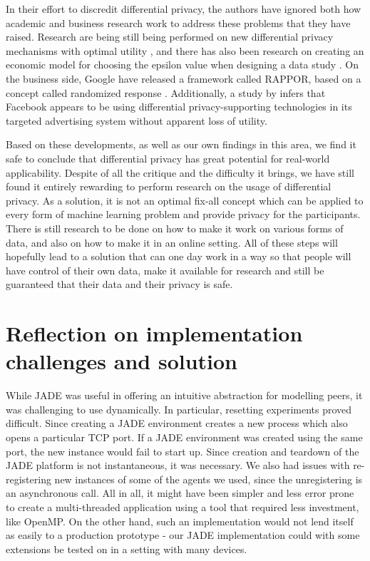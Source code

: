 In their effort to discredit differential privacy, the authors have ignored both how academic and business research work to address these problems that they have raised. Research are being still being performed on new differential privacy mechanisms with optimal utility \citep{eigner2014privada}, and there has also been research on creating an economic model for choosing the epsilon value when designing a data study \citep{hsu2014economicEpsilon}. On the business side, Google have released a framework called RAPPOR, based on a concept called randomized response \citep{erlingsson2014rappor}. Additionally, a study by \cite{chin2012differential} infers that Facebook appears to be using differential privacy-supporting technologies in its targeted advertising system without apparent loss of utility.

Based on these developments, as well as our own findings in this area, we find it safe to conclude that differential privacy has great potential for real-world applicability. Despite of all the critique and the difficulty it brings, we have still found it entirely rewarding to perform research on the usage of differential privacy. As a solution, it is not an optimal fix-all concept which can be applied to every form of machine learning problem and provide privacy for the participants. There is still research to be done on how to make it work on various forms of data, and also on how to make it in an online setting. All of these steps will hopefully lead to a solution that can one day work in a way so that people will have control of their own data, make it available for research and still be guaranteed that their data and their privacy is safe. 

\section{Reflection on implementation challenges and solution}
While JADE was useful in offering an intuitive abstraction for modelling peers, it was challenging to use dynamically. In particular, resetting experiments proved difficult. Since creating a JADE environment creates a new process which also opens a particular TCP port. If a JADE environment was created using the same port, the new instance would fail to start up. Since creation and teardown of the JADE platform is not instantaneous, it was necessary. We also had issues with re-registering new instances of some of the agents we used, since the unregistering is an asynchronous call. All in all, it might have been simpler and less error prone to create a multi-threaded application using a tool that required less investment, like OpenMP. On the other hand, such an implementation would not lend itself as easily to a production prototype - our JADE implementation could with some extensions be tested on in a setting with many devices.

